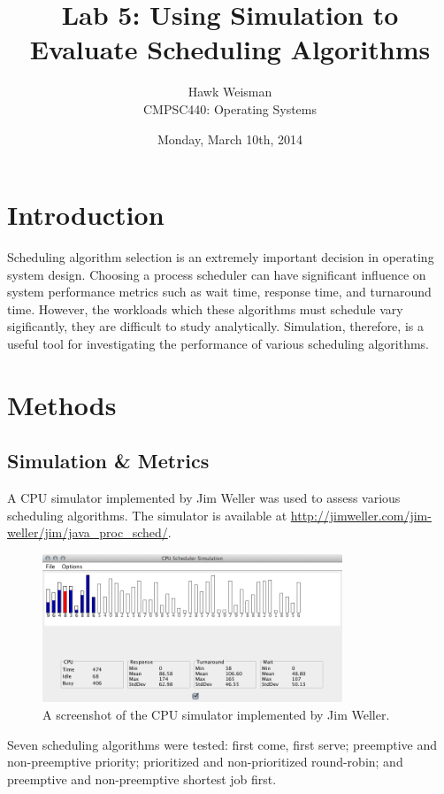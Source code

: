 \documentclass[12pt,letterpaper]{article}
\author{Hawk Weisman\\CMPSC440: Operating Systems}
\title{Lab 5: Using Simulation to Evaluate Scheduling Algorithms}
\date{Monday, March 10th, 2014}
\begin{document}
	\maketitle
	\tableofcontents
  	\section{Introduction}

  		Scheduling algorithm selection is an extremely important decision in operating system design. Choosing a process scheduler can have significant influence on system performance metrics such as wait time, response time, and turnaround time. However, the workloads which these algorithms must schedule vary sigificantly, they are difficult to study analytically. Simulation, therefore, is a useful tool for investigating the performance of various scheduling algorithms.

  	\section{Methods}

  		\subsection{Simulation \& Metrics}
	  		A CPU simulator implemented by Jim Weller was used to assess various scheduling algorithms. The simulator is available at \url{http://jimweller.com/jim-weller/jim/java_proc_sched/}.

	  		\begin{figure}[H]
				\centerline{\includegraphics[width=0.80\textwidth]{figures/sim.png}}
				\caption{A screenshot of the CPU simulator implemented by Jim Weller.}
				\label{fig:screenshot}
			\end{figure}

			Seven scheduling algorithms were tested: first come, first serve; preemptive and non-preemptive priority; prioritized and non-prioritized round-robin; and preemptive and non-preemptive shortest job first. 
\end{document}
